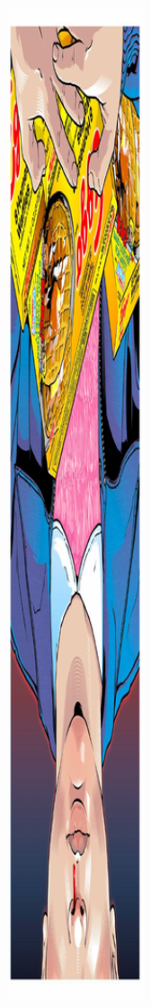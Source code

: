 \documentclass[12pt, a4paper]{article}
\begin{document}
\begin{figure}
\begin{minipage}[h!]{0.3\linewidth}
\includegraphics[width=1\textwidth, height = 0.32\textheight, angle=180]{pop2}

\end{minipage}
\end{figure}
\end{document}
